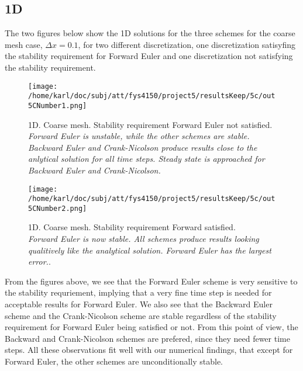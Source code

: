 \documentclass{article}
\begin{document}
\subsection{1D}

The two figures below show the 1D solutions for the three schemes for the coarse mesh case, $\Delta x = 0.1$, for two different discretization, one discretization satisyfing the stability requirement for Forward Euler and one discretization not satisfying the stability requirement.

\begin{minipage}{.45\textwidth} 
	\begin{figure}[H]
		\centering
		\texttt{[image: /home/karl/doc/subj/att/fys4150/project5/resultsKeep/5c/out5CNumber1.png]}
		\caption{1D. Coarse mesh. Stability requirement Forward Euler not satisfied.\\ \textit{Forward Euler is unstable, while the other schemes are stable. Backward Euler and Crank-Nicolson produce results close to the anlytical solution for all time steps. Steady state is approached for Backward Euler and Crank-Nicolson.}}
		\label{1}
	\end{figure}
\end{minipage}\hfill
\begin{minipage}{.45\textwidth} 
	\begin{figure}[H]
		\centering
		\texttt{[image: /home/karl/doc/subj/att/fys4150/project5/resultsKeep/5c/out5CNumber2.png]}
		\caption{1D. Coarse mesh. Stability requirement Forward satisfied.\\ \textit{Forward Euler is now stable. All schemes produce results looking qualitively like the analytical solution. Forward Euler has the largest error.}.}
		\label{fig:unzoomed}
	\end{figure}
\end{minipage}\hfill
\vspace{2ex}

From the figures above, we see that the Forward Euler scheme is very sensitive to the stability requriement, implying that a very fine time step is needed for acceptable results for Forward Euler. We also see that the Backward Euler scheme and the Crank-Nicolson scheme are stable regardless of the stability requirement for Forward Euler being satisfied or not. From this point of view, the Backward and Crank-Nicolson schemes are prefered, since they need fewer time steps. All these observations fit well with our numerical findings, that except for Forward Euler, the other schemes are unconditionally stable.\\
\end{document}
